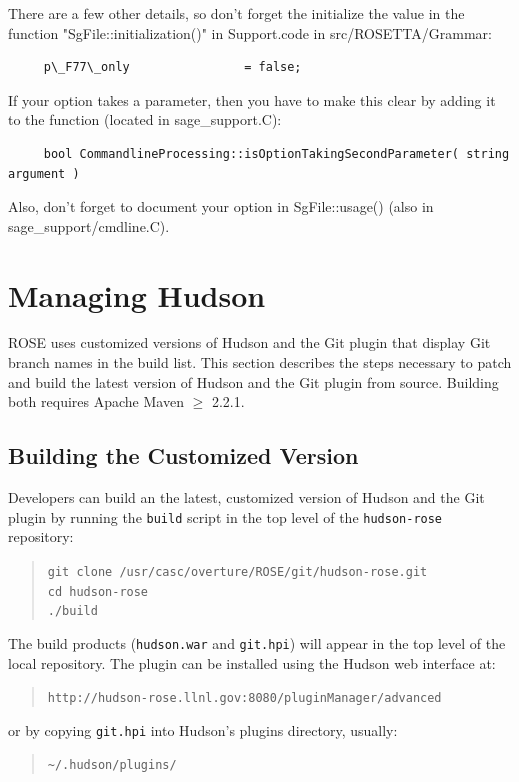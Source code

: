There are a few other details, so don't forget the initialize
the value in the function "SgFile::initialization()" in Support.code
in src/ROSETTA/Grammar:
{
\indent
\begin{verbatim}
     p\_F77\_only                = false;
\end{verbatim} 
}

If your option takes a parameter, then you have to make this clear by adding it to the
function (located in sage\_support.C):
{
\indent
\begin{verbatim}
     bool CommandlineProcessing::isOptionTakingSecondParameter( string argument )
\end{verbatim} 
}

Also, don't forget to document your option in SgFile::usage() (also in sage\_support/cmdline.C).


\section{Managing Hudson}
ROSE uses customized versions of Hudson and the Git plugin that display Git branch names
in the build list. This section describes the steps necessary to patch
and build the latest version of Hudson and the Git plugin from source.
Building both requires Apache Maven $\geq$ 2.2.1. 

\subsection{Building the Customized Version}
Developers can build an the latest, customized version of Hudson and the
Git plugin by running the \texttt{build} script in the top level of the
\texttt{hudson-rose} repository:
\begin{quote}\texttt{git clone /usr/casc/overture/ROSE/git/hudson-rose.git \\
  cd hudson-rose \\
  ./build \\
}
\end{quote}
The build products (\texttt{hudson.war} and \texttt{git.hpi}) will
appear in the top level of the local repository. The plugin can be installed
using the Hudson web interface at:
\begin{quote}\texttt{http://hudson-rose.llnl.gov:8080/pluginManager/advanced}\end{quote}
or by copying \texttt{git.hpi} into Hudson's plugins directory, usually:
\begin{quote}\texttt{\~{}/.hudson/plugins/}\end{quote}

